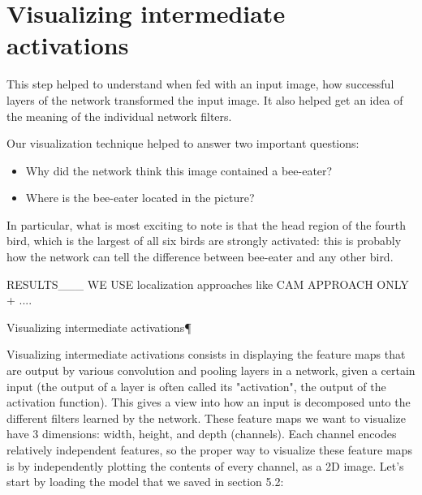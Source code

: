 \section*{Visualizing intermediate activations}

This step helped to understand when fed with an input image, how successful layers of the network transformed the input image. It also helped get an idea of the meaning of the individual network filters.

Our visualization technique helped to answer two important questions:

\begin{itemize}
\item  Why did the network think this image contained a bee-eater?
\item Where is the bee-eater located in the picture?
\end{itemize}

In particular, what is most exciting to note is that the head region of the fourth bird, which is the largest of all six birds are strongly activated: this is probably how the network can tell the difference between bee-eater and any other bird.


\ifalse
RESULTS___
WE USE localization approaches like CAM APPROACH ONLY + ....

Visualizing intermediate activations¶

Visualizing intermediate activations consists in displaying the feature maps that are output by various convolution and pooling layers in a network, given a certain input (the output of a layer is often called its "activation", the output of the activation function). This gives a view into how an input is decomposed unto the different filters learned by the network. These feature maps we want to visualize have 3 dimensions: width, height, and depth (channels). Each channel encodes relatively independent features, so the proper way to visualize these feature maps is by independently plotting the contents of every channel, as a 2D image. Let's start by loading the model that we saved in section 5.2:


